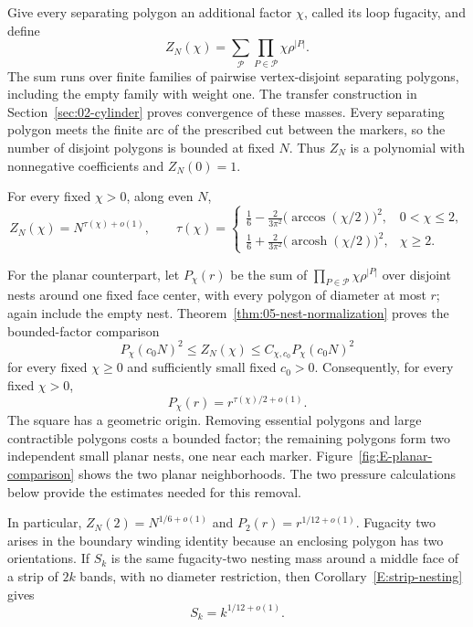 Give every separating polygon an additional factor $\chi$, called its
loop fugacity, and define
\[
 Z_N(\chi)=\sum_{\mathcal P}\prod_{P\in\mathcal P}
                                  \chi\rho^{|P|}.
\]
The sum runs over finite families of pairwise vertex-disjoint separating
polygons, including the empty family with weight one. The transfer
construction in Section~\ref{sec:02-cylinder} proves convergence of
these masses. Every separating polygon meets the finite arc of the
prescribed cut between the markers, so the number of disjoint polygons
is bounded at fixed $N$. Thus $Z_N$ is a polynomial with nonnegative
coefficients and $Z_N(0)=1$.

\begin{theorem}
\label{thm:04-cylinder-exponent}\label{E:cylinder-exponent}
For every fixed $\chi>0$, along even $N$,
\[
 Z_N(\chi)=N^{\tau(\chi)+o(1)},\qquad
 \tau(\chi)=
 \begin{cases}
 \displaystyle\frac16-\frac{2}{3\pi^2}
              \bigl(\arccos(\chi/2)\bigr)^2,&0<\chi\le2,\\[4pt]
 \displaystyle\frac16+\frac{2}{3\pi^2}
              \bigl(\operatorname{arcosh}(\chi/2)\bigr)^2,&\chi\ge2.
 \end{cases}
\]
\end{theorem}

For the planar counterpart, let $P_\chi(r)$ be the sum of
$\prod_{P\in\mathcal P}\chi\rho^{|P|}$ over disjoint nests around
one fixed face center, with every polygon of diameter at most $r$;
again include the empty nest. Theorem~\ref{thm:05-nest-normalization}
proves the bounded-factor comparison
\[
 P_\chi(c_0N)^2\le Z_N(\chi)
       \le C_{\chi,c_0}P_\chi(c_0N)^2
\]
for every fixed $\chi\ge0$ and sufficiently small fixed $c_0>0$.
Consequently, for every fixed $\chi>0$,
\[
 P_\chi(r)=r^{\tau(\chi)/2+o(1)}.
\]
The square has a geometric origin. Removing essential polygons and
large contractible polygons costs a bounded factor; the remaining
polygons form two independent small planar nests, one near each marker.
Figure~\ref{fig:E-planar-comparison} shows the two planar neighborhoods.
The two pressure calculations below provide the estimates needed for
this removal.

In particular, $Z_N(2)=N^{1/6+o(1)}$ and
$P_2(r)=r^{1/12+o(1)}$. Fugacity two arises in the boundary winding
identity because an enclosing polygon has two orientations. If $S_k$
is the same fugacity-two nesting mass around a middle face of a strip
of $2k$ bands, with no diameter restriction, then
Corollary~\ref{E:strip-nesting} gives
\[
 S_k=k^{1/12+o(1)}.
\]

